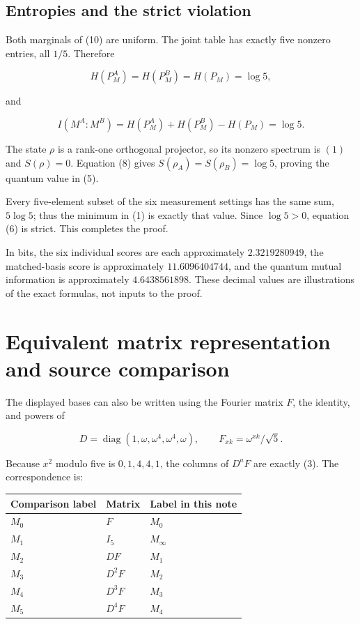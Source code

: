 \documentclass[11pt,a4paper]{article}
\begin{document}
\subsection{Entropies and the strict violation}

Both marginals of (10) are uniform. The joint table has exactly five
nonzero entries, all \(1/5\). Therefore

\[
 H(P_M^A)=H(P_M^B)=H(P_M)=\log5,
\]

and

\[
 I(M^A:M^B)=H(P_M^A)+H(P_M^B)-H(P_M)=\log5.
\]

The state \(\rho\) is a rank-one orthogonal projector, so its nonzero
spectrum is \((1)\) and \(S(\rho)=0\). Equation (8) gives
\(S(\rho_A)=S(\rho_B)=\log5\), proving the quantum value in (5).

Every five-element subset of the six measurement settings has the same
sum, \(5\log5\); thus the minimum in (1) is exactly that value. Since
\(\log5>0\), equation (6) is strict. This completes the proof.

In bits, the six individual scores are each approximately
\(2.3219280949\), the matched-basis score is approximately \(11.6096404744\), and
the quantum mutual information is approximately \(4.6438561898\). These
decimal values are illustrations of the exact formulas, not inputs to
the proof.

\section{Equivalent matrix representation and source comparison}

The displayed bases can also be written using the Fourier matrix \(F\),
the identity, and powers of

\[
 D=\operatorname{diag}(1,\omega,\omega^4,\omega^4,\omega),
 \qquad F_{xk}=\omega^{xk}/\sqrt5.
\]

Because \(x^2\) modulo five is \(0,1,4,4,1\), the columns of \(D^aF\)
are exactly (3). The correspondence is:

\begin{center}
\begin{tabular}{@{}lll@{}}
\toprule\noalign{}
Comparison label & Matrix & Label in this note \\
\midrule\noalign{}
\(M_0\) & \(F\) & \(M_0\) \\
\(M_1\) & \(I_5\) & \(M_\infty\) \\
\(M_2\) & \(DF\) & \(M_1\) \\
\(M_3\) & \(D^2F\) & \(M_2\) \\
\(M_4\) & \(D^3F\) & \(M_3\) \\
\(M_5\) & \(D^4F\) & \(M_4\) \\
\bottomrule
\end{tabular}
\end{center}
\end{document}
